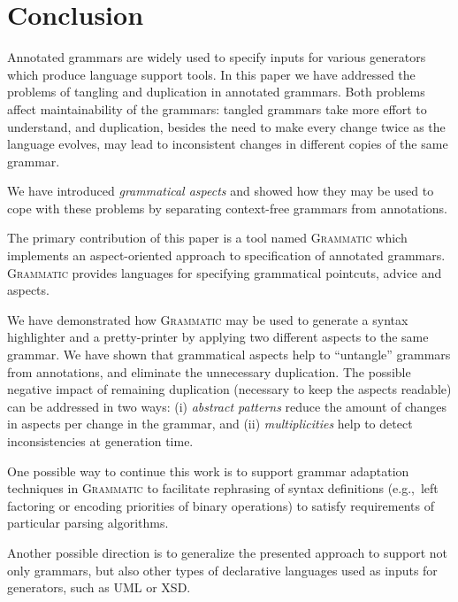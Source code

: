 \documentclass{IOS-Book-Article}     %
\newcommand{\tool}[1]{\textsc{#1}}
\newcommand{\Grammatic}[0]{\tool{Grammatic}}
\begin{document}
\section{Conclusion}\label{Conclusion}

Annotated grammars are widely used to specify inputs for various generators which produce language support tools.
In this paper we have addressed the problems of tangling and duplication in annotated grammars. Both problems affect maintainability of the grammars: tangled grammars take more effort to understand, and duplication, besides the need to make every change twice as the language evolves, may lead to inconsistent changes in different copies of the same grammar.

We have introduced \emph{grammatical aspects} and showed how they may be used to cope with these problems by separating context-free grammars from annotations. 

The primary contribution of this paper is a tool named \Grammatic{} which implements an aspect-oriented approach to specification of annotated grammars. \Grammatic{} provides languages for specifying grammatical pointcuts, advice and aspects.

We have demonstrated how \Grammatic{} may be used to generate a syntax highlighter and a pretty-printer by applying two different aspects to the same grammar. We have shown that grammatical aspects help to ``untangle'' grammars from annotations, and eliminate the unnecessary duplication. The possible negative impact of remaining duplication (necessary to keep the aspects readable) can be addressed in two ways:
	(i) \emph{abstract patterns} reduce the amount of changes in aspects per change in the grammar, and
	(ii) \emph{multiplicities} help to detect inconsistencies at generation time.

One possible way to continue this work is to support grammar adaptation techniques \cite{Laemmel} in \Grammatic{} to facilitate rephrasing of syntax definitions (e.g.,~left factoring or encoding priorities of binary operations) to satisfy requirements of particular parsing algorithms.

Another possible direction is to generalize the presented approach to support not only grammars, but also other types of declarative languages used as inputs for generators, such as UML or XSD.





\end{document}
